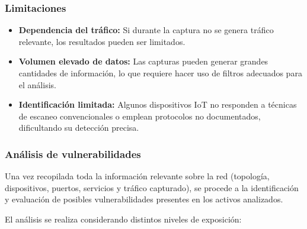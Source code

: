 \documentclass[a4paper, 11pt]{article}
\begin{document}
\vspace{0.5cm}
\subsubsection*{Limitaciones}

\begin{itemize}
    \item \textbf{Dependencia del tráfico:} Si durante la captura no se genera tráfico relevante, los resultados pueden ser limitados.
        
    \item \textbf{Volumen elevado de datos:} Las capturas pueden generar grandes cantidades de información, lo que requiere hacer uso de filtros adecuados para el análisis.

    \item \textbf{Identificación limitada:} Algunos dispositivos IoT no responden a técnicas de escaneo convencionales o emplean protocolos no documentados, dificultando su detección precisa.

\end{itemize}

\par\vspace{0.5cm}








\subsubsection{Análisis de vulnerabilidades}

Una vez recopilada toda la información relevante sobre la red (topología, dispositivos, puertos, servicios y tráfico capturado), se procede a la identificación y evaluación de posibles vulnerabilidades presentes en los activos analizados.

\vspace{0.5cm}
El análisis se realiza considerando distintos niveles de exposición:
\end{document}

